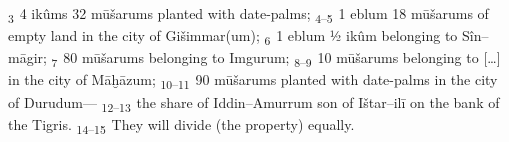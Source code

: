 \documentclass{memoir}
\begin{document}
\begin{pairs}
\begin{Rightside}
    \noindent\textsubscript{3~}4 {\sffamily ikûm}s 32 {\sffamily mūšarum}s planted with date-palms;\pend
    \noindent\textsubscript{4--5~}1 {\sffamily eblum} 18 {\sffamily mūšarum}s of empty land in the city of {\sffamily Gišimmar(um)};\pend
    \noindent\textsubscript{6~}1 {\sffamily eblum} ½ {\sffamily ikûm} belonging to S{\sffamily în--māgir};\pend
    \noindent\textsubscript{7~}80 {\sffamily mūšarum}s belonging to {\sffamily Imgurum};\pend
    \noindent\textsubscript{8--9~}10 {\sffamily mūšarum}s belonging to [\dots] in the city of {\sffamily Māḫāzum};\pend
    \noindent\textsubscript{10--11~}90 {\sffamily mūšarum}s planted with date-palms in the city of {\sffamily Durudum}---\pend
    \noindent\textsubscript{12--13~}the share of {\sffamily Iddin--Amurrum} son of {\sffamily Ištar--ilī} on the bank of the Tigris.\pend
    \noindent\textsubscript{14--15~}They will divide (the property) equally.\pend
    \pausenumbering
  \end{Rightside}
\end{pairs}
\Columns
{}\leavevmode
\end{document}
